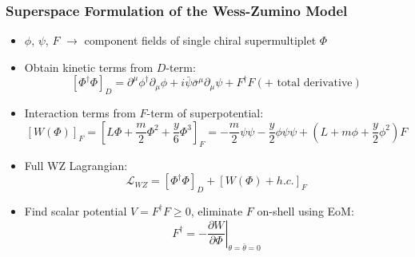 \documentclass[10pt,aspectratio=169]{beamer}
\begin{document}
\begin{frame}
  \frametitle{Superspace Formulation of the Wess-Zumino Model}
  \begin{itemize}\itemsep1em
  \item $\phi$, $\psi$, $F$ $\to$ component fields of single chiral
    supermultiplet $\Phi$
  \item Obtain kinetic terms from $D$-term:
    \begin{equation*}
      \left [ \Phi^\dagger \Phi \right ]_D = \partial^\mu \phi^\dagger
      \partial_\mu \phi + i \bar{\psi} \bar{\sigma}^\mu \partial_\mu \psi
      + F^\dagger F ( + \text{ total derivative})
    \end{equation*}
  \item Interaction terms from $F$-term of {\color{blue} superpotential}:
    \begin{equation*}
      \left [ W(\Phi) \right ]_F = \left [ L \Phi + \frac{m}{2} \Phi^2
        + \frac{y}{6} \Phi^3 \right ]_F
      = -\frac{m}{2} \psi \psi - \frac{y}{2} \phi \psi \psi
      + (L + m \phi + \frac{y}{2} \phi^2) F
    \end{equation*}
    \item Full WZ Lagrangian:
      \begin{equation*}
        \mathcal{L}_{WZ} = \left [ \Phi^\dagger \Phi \right ]_D
        + \left [ W(\Phi) + h.c. \right ]_F
      \end{equation*}
    \item Find scalar potential $V = F^\dagger F \geq 0$, eliminate
      $F$ on-shell using EoM:
      \begin{equation*}
        F^\dagger = - \left . \frac{\partial W}{\partial \Phi} \right |_{\theta
          = \bar{\theta} = 0}
      \end{equation*}
  \end{itemize}
\end{frame}
\end{document}
